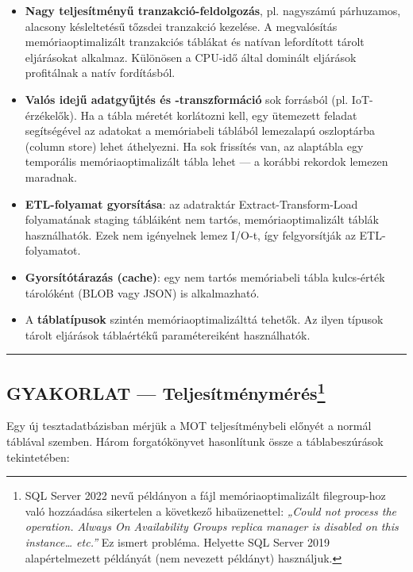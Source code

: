 \documentclass[
  magyar,
]{article}
\providecommand{\tightlist}{%
  \setlength{\itemsep}{0pt}\setlength{\parskip}{0pt}}
\begin{document}
\begin{itemize}
\tightlist
\item
  \textbf{Nagy teljesítményű tranzakció-feldolgozás}, pl. nagyszámú
  párhuzamos, alacsony késleltetésű tőzsdei tranzakció kezelése. A
  megvalósítás memóriaoptimalizált tranzakciós táblákat és natívan
  lefordított tárolt eljárásokat alkalmaz. Különösen a CPU-idő által
  dominált eljárások profitálnak a natív fordításból.
\item
  \textbf{Valós idejű adatgyűjtés és -transzformáció} sok forrásból (pl.
  IoT-érzékelők). Ha a tábla méretét korlátozni kell, egy ütemezett
  feladat segítségével az adatokat a memóriabeli táblából lemezalapú
  oszloptárba (column store) lehet áthelyezni. Ha sok frissítés van, az
  alaptábla egy temporális memóriaoptimalizált tábla lehet --- a korábbi
  rekordok lemezen maradnak.
\item
  \textbf{ETL-folyamat gyorsítása}: az adatraktár Extract-Transform-Load
  folyamatának staging tábláiként nem tartós, memóriaoptimalizált táblák
  használhatók. Ezek nem igényelnek lemez I/O-t, így felgyorsítják az
  ETL-folyamatot.
\item
  \textbf{Gyorsítótárazás (cache)}: egy nem tartós memóriabeli tábla
  kulcs-érték tárolóként (BLOB vagy JSON) is alkalmazható.
\item
  A \textbf{táblatípusok} szintén memóriaoptimalizálttá tehetők. Az
  ilyen típusok tárolt eljárások táblaértékű paramétereiként
  használhatók.
\end{itemize}

\begin{center}\rule{0.5\linewidth}{0.5pt}\end{center}

\subsection[GYAKORLAT --- Teljesítménymérés]{\texorpdfstring{GYAKORLAT
---
Teljesítménymérés\footnote{SQL Server 2022 nevű példányon a fájl
  memóriaoptimalizált filegroup-hoz való hozzáadása sikertelen a
  következő hibaüzenettel: \emph{„Could not process the operation.
  Always On Availability Groups replica manager is disabled on this
  instance\ldots{} etc.''} Ez ismert probléma. Helyette SQL Server 2019
  alapértelmezett példányát (nem nevezett példányt) használjuk.}}{GYAKORLAT --- Teljesítménymérés}}\label{gyakorlat-teljesuxedtmuxe9nymuxe9ruxe9s54}

Egy új tesztadatbázisban mérjük a MOT teljesítménybeli előnyét a normál
táblával szemben. Három forgatókönyvet hasonlítunk össze a
táblabeszúrások tekintetében:
\end{document}
